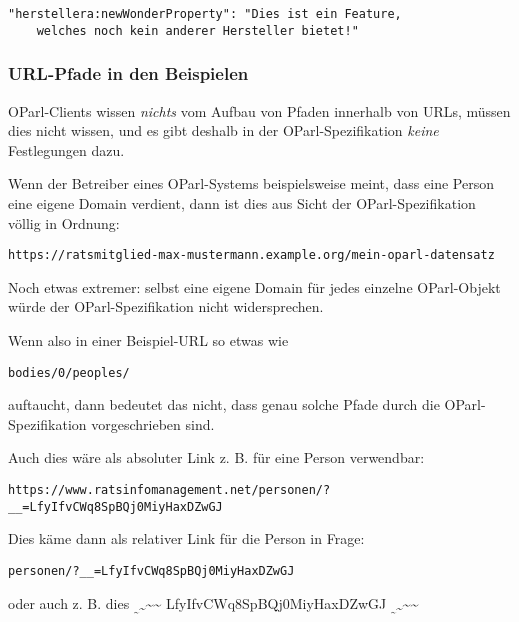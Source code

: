 \documentclass[,a4paper]{article}
\begin{document}
\begin{verbatim}
"herstellera:newWonderProperty": "Dies ist ein Feature,
    welches noch kein anderer Hersteller bietet!"
\end{verbatim}

\subsubsection{URL-Pfade in den
Beispielen}\label{url-pfade-in-den-beispielen}

OParl-Clients wissen \emph{nichts} vom Aufbau von Pfaden innerhalb von
URLs, müssen dies nicht wissen, und es gibt deshalb in der
OParl-Spezifikation \emph{keine} Festlegungen dazu.

Wenn der Betreiber eines OParl-Systems beispielsweise meint, dass eine
Person eine eigene Domain verdient, dann ist dies aus Sicht der
OParl-Spezifikation völlig in Ordnung:

\begin{verbatim}
https://ratsmitglied-max-mustermann.example.org/mein-oparl-datensatz
\end{verbatim}

Noch etwas extremer: selbst eine eigene Domain für jedes einzelne
OParl-Objekt würde der OParl-Spezifikation nicht widersprechen.

Wenn also in einer Beispiel-URL so etwas wie

\begin{verbatim}
bodies/0/peoples/
\end{verbatim}

auftaucht, dann bedeutet das nicht, dass genau solche Pfade durch die
OParl-Spezifikation vorgeschrieben sind.

Auch dies wäre als absoluter Link z. B. für eine Person verwendbar:

\begin{verbatim}
https://www.ratsinfomanagement.net/personen/?__=LfyIfvCWq8SpBQj0MiyHaxDZwGJ
\end{verbatim}

Dies käme dann als relativer Link für die Person in Frage:

\begin{verbatim}
personen/?__=LfyIfvCWq8SpBQj0MiyHaxDZwGJ
\end{verbatim}

oder auch z. B. dies
\textsubscript{\textsubscript{\textasciitilde{}}\textasciitilde{}}\textasciitilde{}\textasciitilde{}
LfyIfvCWq8SpBQj0MiyHaxDZwGJ
\textsubscript{\textsubscript{\textasciitilde{}}\textasciitilde{}}\textasciitilde{}\textasciitilde{}
\end{document}
